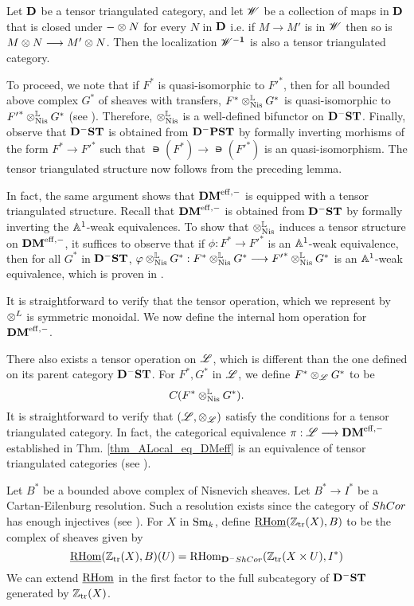 \begin{lem}\label{lem_loc_and_tensor}
Let $\DCat$ be a tensor triangulated category, and let $\Cat{W}$
be a collection of maps in $\DCat$ that is closed under $-\tensor 
N$ for every $N$ in $\DCat$ i.e. if $M \to M'$ is in $\Cat{W}$ then 
so is $M \tensor N \to M' \tensor N$. Then the localization $\DCat 
[\Cat{W}^{-1}]$ is also a tensor triangulated category.
\end{lem}

To proceed, we note that if $F^*$ is quasi-isomorphic to ${F'}^*$,
then for all bounded above complex $G^*$ of sheaves with transfers, 
$F^* \tLNis G^*$ is quasi-isomorphic to ${F'}^* \tLNis G^*$ (see
\cite[8.16]{MVW}). Therefore, $\tLNis$ is a well-defined 
bifunctor on $\DShCor$. Finally, observe that $\DShCor$ is 
obtained from $\DCat^-\PST$ by formally inverting morhisms of the 
form $F^* \to {F'}^*$ such that $\nis(F^*) \to \nis({F'}^*)$ is an 
quasi-isomorphism. The tensor triangulated structure now follows 
from the preceding lemma.

In fact, the same argument shows that $\DMeff$ is equipped with a
tensor triangulated structure. Recall that $\DMeff$ is obtained
from $\DShCor$ by formally inverting the $\A^1$-weak equivalences.
To show that $\tLNis$ induces a tensor structure on $\DMeff$, it
suffices to observe that if $\phi : F^* \to {F'}^*$ is an $\A^1$-weak 
equivalence, then for all $G^*$ in $\DShCor$, $\phi \tLNis G^* : 
F^* \tLNis G^* \to {F'}^* \tLNis G^*$ is an $\A^1$-weak 
equivalence, which is proven in \cite[9.5]{MVW}.

It is straightforward to verify that the tensor operation, which
we represent by $\tDM$ is symmetric monoidal. We now define the 
internal hom operation for $\DMeff$.

There also exists a tensor operation on $\ALocal$, which is 
different than the one defined on its parent category $\DShCor$.
For $F^*, G^*$ in $\ALocal$, we define $F^* \tAL G^*$ to be
\[
\suslC[]( F^* \tLNis G^* ).
\]
It is straightforward to verify that $(\ALocal, \tAL)$ satisfy
the conditions for a tensor triangulated category. In fact, the
categorical equivalence $\pi : \ALocal \to \DMeff$ established
in Thm. \ref{thm_ALocal_eq_DMeff} is an equivalence of tensor
triangulated categories (see \cite[14.11]{MVW}).

\begin{defn}
Let $B^*$ be a bounded above complex of Nisnevich sheaves. Let $B^*
\to I^*$ be a Cartan-Eilenburg resolution. Such a resolution 
exists since the category of $\ShCor$ has enough injectives (see 
\cite[6.19]{MVW}). For $X$ in $\Sm$, define 
$\sheaf{\rhom}(\Ztr(X), B)$ to be the complex of sheaves given by
\[
\sheaf{\rhom}(\Ztr(X), B)(U) = \rhom_{\DCat^-\ShCor}(\Ztr(X \times U),
I^*)
\]
We can extend $\sheaf{\rhom}$ in the first factor to the full 
subcategory of $\DShCor$ generated by $\Ztr(X)$.
\end{defn}

